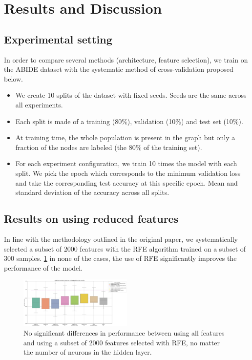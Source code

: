 \section{Results and Discussion}



\subsection{Experimental setting}
In order to compare several methods (architecture, feature selection), we train on the ABIDE dataset with the systematic method of cross-validation proposed below.
\begin{itemize}
	\item We create 10 splits of the dataset with fixed seeds. Seeds are the same across all experiments.
	\item Each split is made of a training (80\%), validation (10\%) and test set (10\%).
	\item At training time, the whole population is present in the graph but only a fraction of the nodes are labeled (the 80\% of the training set).
	\item For each experiment configuration, we train 10 times the model with each split.
	We pick the epoch which corresponds to the minimum validation loss and take the corresponding test accuracy at this specific epoch. Mean and standard deviation of the accuracy across all splits.
\end{itemize}


\subsection{Results on using reduced features}

In line with the methodology outlined in the original paper, we systematically selected a subset of $2000$ features with the RFE algorithm trained on a subset of 300 samples.
\ref{fig:results_feature_reduction}  in none of the cases, the use of RFE significantly improves the performance of the model.

\begin{figure}[h!]
    \centering
    \includegraphics[width=0.5\textwidth]{figures/performances_fully_connected_RFE.png}
    \caption{No significant differences in performance between using all features and using a subset of 2000 features selected with RFE, no matter the number of neurons in the hidden layer.}
    \Description{}
    \label{fig:results_feature_reduction}
\end{figure}

